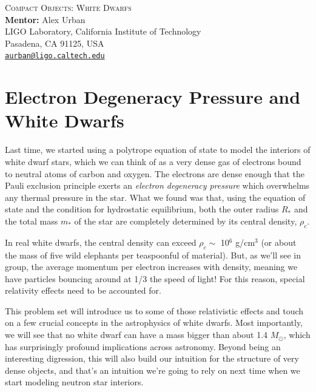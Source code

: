 \documentclass[11pt]{article}
\begin{document}
\begin{center}
{\Large\textsc{Compact Objects: White Dwarfs}} \\
\vspace{10pt}
{\large \textbf{Mentor:} Alex Urban} \\
{\small LIGO Laboratory, California Institute of Technology \\
Pasadena, CA 91125, USA \\
\href{mailto:aurban@ligo.caltech.edu}{\texttt{aurban@ligo.caltech.edu}}}
\end{center}


\section*{Electron Degeneracy Pressure and White Dwarfs}

\hspace{15pt} Last time, we started using a polytrope equation of state to model the interiors of white dwarf stars, which we can think of as a very dense gas of electrons bound to neutral atoms of carbon and oxygen. The electrons are dense enough that the Pauli exclusion principle exerts an \textit{electron degeneracy pressure} which overwhelms any thermal pressure in the star. What we found was that, using the equation of state and the condition for hydrostatic equilibrium, both the outer radius $R_*$ and the total mass $m_*$ of the star are completely determined by its central density, $\rho_c$.

\hspace{15pt} In real white dwarfs, the central density can exceed $\rho_c \sim$ 10$^6$ g/cm$^3$ (or about the mass of five wild elephants per teaspoonful of material). But, as we'll see in group, the average momentum per electron increases with density, meaning we have particles bouncing around at 1/3 the speed of light! For this reason, special relativity effects need to be accounted for.

\hspace{15pt} This problem set will introduce us to some of those relativistic effects and touch on a few crucial concepts in the astrophysics of white dwarfs. Most importantly, we will see that no white dwarf can have a mass bigger than about 1.4 $M_{\odot}$, which has surprisingly profound implications across astronomy. Beyond being an interesting digression, this will also build our intuition for the structure of very dense objects, and that's an intuition we're going to rely on next time when we start modeling neutron star interiors.
\end{document}

